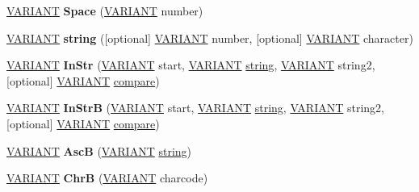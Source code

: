 \begin{DoxyCompactItemize}
\hyperlink{structtag_v_a_r_i_a_n_t}{V\+A\+R\+I\+A\+NT} {\bfseries Space} (\hyperlink{structtag_v_a_r_i_a_n_t}{V\+A\+R\+I\+A\+NT} number)
\item 
\mbox{\label{interface_v_b_script___global_1_1_global_obj_a24d0b5792e985a540dabaa34945ed935}} 
\hyperlink{structtag_v_a_r_i_a_n_t}{V\+A\+R\+I\+A\+NT} {\bfseries string} (\mbox{[}optional\mbox{]} \hyperlink{structtag_v_a_r_i_a_n_t}{V\+A\+R\+I\+A\+NT} number, \mbox{[}optional\mbox{]} \hyperlink{structtag_v_a_r_i_a_n_t}{V\+A\+R\+I\+A\+NT} character)
\item 
\mbox{\label{interface_v_b_script___global_1_1_global_obj_a1f2b80a64d1330b3096fde1367db859a}} 
\hyperlink{structtag_v_a_r_i_a_n_t}{V\+A\+R\+I\+A\+NT} {\bfseries In\+Str} (\hyperlink{structtag_v_a_r_i_a_n_t}{V\+A\+R\+I\+A\+NT} start, \hyperlink{structtag_v_a_r_i_a_n_t}{V\+A\+R\+I\+A\+NT} \hyperlink{structstring}{string}, \hyperlink{structtag_v_a_r_i_a_n_t}{V\+A\+R\+I\+A\+NT} string2, \mbox{[}optional\mbox{]} \hyperlink{structtag_v_a_r_i_a_n_t}{V\+A\+R\+I\+A\+NT} \hyperlink{structcompare}{compare})
\item 
\mbox{\label{interface_v_b_script___global_1_1_global_obj_a488c395c9cd8e74b335372df88b4865f}} 
\hyperlink{structtag_v_a_r_i_a_n_t}{V\+A\+R\+I\+A\+NT} {\bfseries In\+StrB} (\hyperlink{structtag_v_a_r_i_a_n_t}{V\+A\+R\+I\+A\+NT} start, \hyperlink{structtag_v_a_r_i_a_n_t}{V\+A\+R\+I\+A\+NT} \hyperlink{structstring}{string}, \hyperlink{structtag_v_a_r_i_a_n_t}{V\+A\+R\+I\+A\+NT} string2, \mbox{[}optional\mbox{]} \hyperlink{structtag_v_a_r_i_a_n_t}{V\+A\+R\+I\+A\+NT} \hyperlink{structcompare}{compare})
\item 
\mbox{\label{interface_v_b_script___global_1_1_global_obj_a62d0cd02a1afd868591782c6e4193fac}} 
\hyperlink{structtag_v_a_r_i_a_n_t}{V\+A\+R\+I\+A\+NT} {\bfseries AscB} (\hyperlink{structtag_v_a_r_i_a_n_t}{V\+A\+R\+I\+A\+NT} \hyperlink{structstring}{string})
\item 
\mbox{\label{interface_v_b_script___global_1_1_global_obj_a855f1893a26fcdcab9a69ec03d194b16}} 
\hyperlink{structtag_v_a_r_i_a_n_t}{V\+A\+R\+I\+A\+NT} {\bfseries ChrB} (\hyperlink{structtag_v_a_r_i_a_n_t}{V\+A\+R\+I\+A\+NT} charcode)

\end{DoxyCompactItemize}
